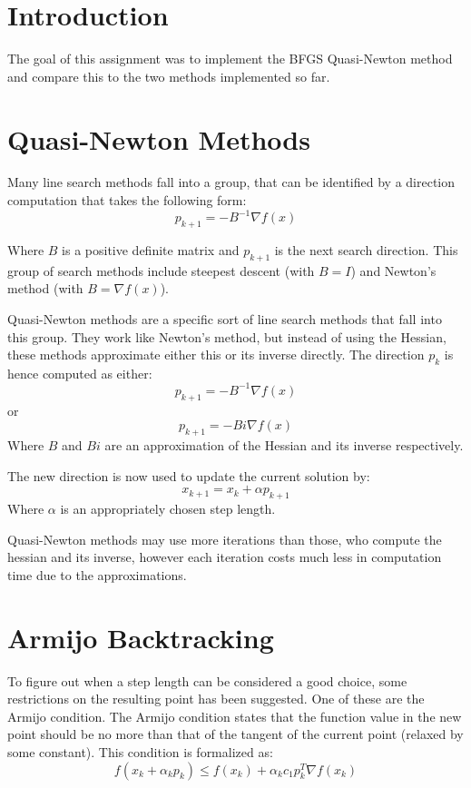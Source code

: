 \documentclass[10pt,oneside,a4paper,final,english]{memoir}
\begin{document}




\maketitle
\newpage

\section{Introduction}
The goal of this assignment was to implement the BFGS Quasi-Newton
method and compare this to the two methods implemented so far.

\section{Quasi-Newton Methods}
Many line search methods fall into a group, that can be identified by
a direction computation that takes the following form:
\[ p_{k+1} = - B^{-1} \nabla f(x) \]

Where $B$ is a positive definite matrix and $p_{k+1}$ is the
next search direction. This group of search methods include steepest
descent (with $B = I$) and Newton's method (with $B = \nabla f(x)$).

Quasi-Newton methods are a specific sort of line search methods that
fall into this group. They work like Newton's method, but instead of
using the Hessian, these methods approximate either this or its
inverse directly. The direction $p_k$ is hence computed as either:
\[ p_{k+1} = - B^{-1} \nabla f(x) \]
or \[ p_{k+1} = - Bi \nabla f(x) \]
Where $B$ and $Bi$ are an approximation of the Hessian and its inverse
respectively.

The new direction is now used to update the current solution by:
\[ x_{k+1} = x_k + \alpha p_{k+1} \]
Where $\alpha$ is an appropriately chosen step length.

Quasi-Newton methods may use more iterations than those, who compute
the hessian and its inverse, however each iteration costs much less in
computation time due to the approximations.

\section{Armijo Backtracking}

To figure out when a step length can be considered a good choice, some
restrictions on the resulting point has been suggested. One of these
are the Armijo condition. The Armijo condition states that the
function value in the new point should be no more than that of the
tangent of the current point (relaxed by some constant). This
condition is formalized as:
\[ f(x_k + \alpha_k p_k) \leq f(x_k) +
\alpha_k c_1 p_k^T \nabla f(x_k) \]
\end{document}
